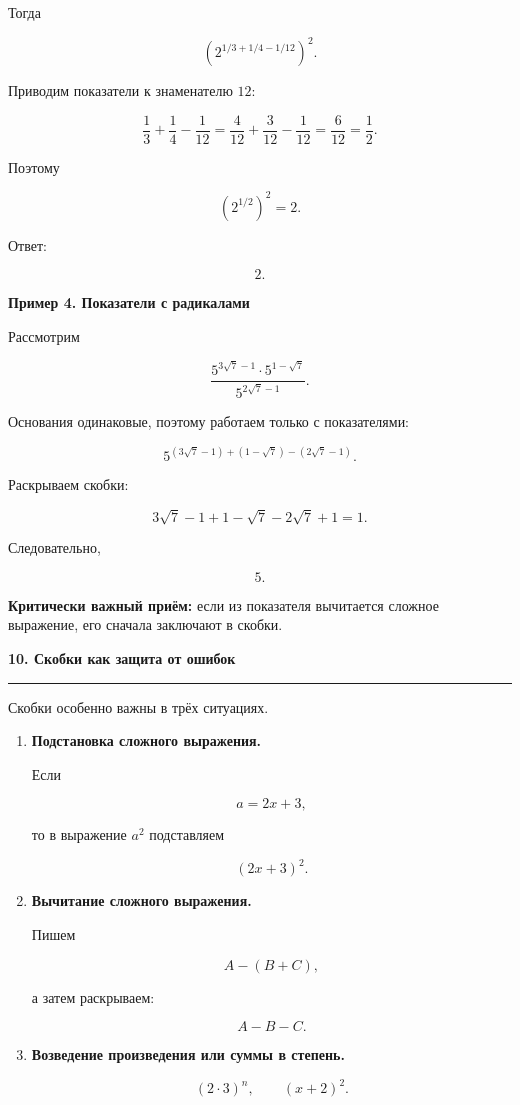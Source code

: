 \documentclass[a4paper,12pt]{article}
\newcommand{\MainSection}[1]{%
  \vspace{0.7em}
  {\Large\bfseries\color{darkaccent}#1\par}
  \vspace{0.25em}
  {\color{accent}\rule{\linewidth}{0.6pt}}
  \vspace{0.5em}
}
\newcommand{\SubSection}[1]{%
  \vspace{0.5em}
  {\large\bfseries\color{accent}#1\par}
  \vspace{0.2em}
}
\newcommand{\important}[1]{\textbf{\color{darkaccent}#1}}
\begin{document}
Тогда

\[
\left(
2^{1/3+1/4-1/12}
\right)^2.
\]

Приводим показатели к знаменателю \(12\):

\[
\frac13+\frac14-\frac1{12}
=
\frac4{12}+\frac3{12}-\frac1{12}
=
\frac6{12}
=
\frac12.
\]

Поэтому

\[
\left(2^{1/2}\right)^2
=
2.
\]

Ответ:

\[
\boxed2.
\]


\SubSection{Пример 4. Показатели с радикалами}

Рассмотрим

\[
\frac{
5^{3\sqrt7-1}\cdot
5^{1-\sqrt7}
}{
5^{2\sqrt7-1}
}.
\]

Основания одинаковые, поэтому работаем только с показателями:

\[
5^{
(3\sqrt7-1)
+
(1-\sqrt7)
-
(2\sqrt7-1)
}.
\]

Раскрываем скобки:

\[
3\sqrt7-1+1-\sqrt7-2\sqrt7+1=1.
\]

Следовательно,

\[
\boxed5.
\]

\important{Критически важный приём:}
если из показателя вычитается сложное выражение,
его сначала заключают в скобки.


\MainSection{10. Скобки как защита от ошибок}

Скобки особенно важны в трёх ситуациях.

\begin{enumerate}

\item
\important{Подстановка сложного выражения.}

Если

\[
a=2x+3,
\]

то в выражение \(a^2\) подставляем

\[
(2x+3)^2.
\]

\item
\important{Вычитание сложного выражения.}

Пишем

\[
A-(B+C),
\]

а затем раскрываем:

\[
A-B-C.
\]

\item
\important{Возведение произведения или суммы в степень.}

\[
(2\cdot3)^n,
\qquad
(x+2)^2.
\]

\end{enumerate}
\end{document}
